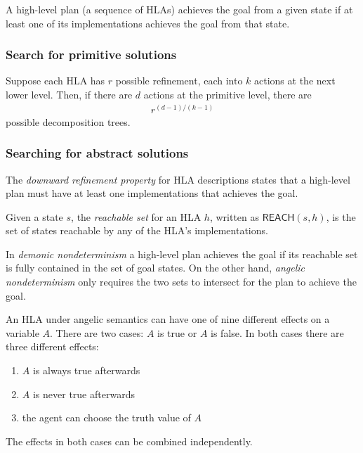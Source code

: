 \documentclass{article}
\begin{document}
\begin{definition}[R\&N p. 407]
    A high-level plan (a sequence of HLAs) achieves the goal from a given state
    if at least one of its implementations achieves the goal from that state.
\end{definition}

\subsubsection{Search for primitive solutions}

\begin{theorem}[R\&N p. 409]
    Suppose each HLA has $r$ possible refinement, each into $k$ actions at the
    next lower level. Then, if there are $d$ actions at the primitive level,
    there are
    \begin{align*}
        r^{(d-1)/(k-1)}
    \end{align*}
    possible decomposition trees.
\end{theorem}

\subsubsection{Searching for abstract solutions}

\begin{definition}[R\&N p. 410]
    The \emph{downward refinement property} for HLA descriptions states that
    a high-level plan must have at least one implementations that achieves the
    goal.
\end{definition}

\begin{definition}[R\&N p. 411]
    Given a state $s$, the \emph{reachable set} for an HLA $h$, written as
    $\textsf{REACH}(s,h)$, is the set of states reachable by any of the HLA's
    implementations.
\end{definition}

\begin{definition}
    In \emph{demonic nondeterminism} a high-level plan achieves the goal if
    its reachable set is fully contained in the set of goal states.
    On the other hand, \emph{angelic nondeterminism} only requires the two
    sets to intersect for the plan to achieve the goal.
\end{definition}

\begin{theorem}[R\&N p. 412]
    An HLA under angelic semantics can have one of nine different effects on
    a variable $A$. There are two cases: $A$ is true or $A$ is false. In both
    cases there are three different effects:
    \begin{enumerate}
        \item $A$ is always true afterwards
        \item $A$ is never true afterwards
        \item the agent can choose the truth value of $A$
    \end{enumerate}
    The effects in both cases can be combined independently.
\end{theorem}
\end{document}
